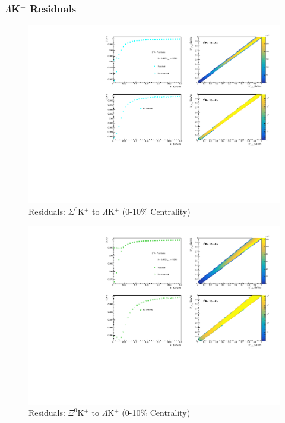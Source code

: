 \documentclass[../AnalysisNoteJBuxton.tex]{subfiles}
\begin{document}
\subsubsection{\texorpdfstring{$\Lambda$K$^{+}$}{TEXT} Residuals}
\label{Residuals_LamKchP}

\begin{figure}[h]
  \centering
  \includegraphics[width=\textwidth]{9_AdditionalFigures/Figures/Residuals/LamKchP/Residuals_LamKchP_0010_Sig0KchP_MomResCrctn_NonFlatBgdCrctn_10Res_PrimMaxDecay4fm_UsingXiDataAndCoulombOnly.pdf}
  \caption[Residuals: $\Sigma^{0}$K$^{+}$ to $\Lambda$K$^{+}$ (0-10\% Centrality)]{Residuals: $\Sigma^{0}$K$^{+}$ to $\Lambda$K$^{+}$ (0-10\% Centrality)}
  \label{fig:Res_LamKchP_0010_Sig0KchP}
\end{figure}


\begin{figure}[h]
  \centering
  \includegraphics[width=\textwidth]{9_AdditionalFigures/Figures/Residuals/LamKchP/Residuals_LamKchP_0010_Xi0KchP_MomResCrctn_NonFlatBgdCrctn_10Res_PrimMaxDecay4fm_UsingXiDataAndCoulombOnly.pdf}
  \caption[Residuals: $\Xi^{0}$K$^{+}$ to $\Lambda$K$^{+}$ (0-10\% Centrality)]{Residuals: $\Xi^{0}$K$^{+}$ to $\Lambda$K$^{+}$ (0-10\% Centrality)}
  \label{fig:Res_LamKchP_0010_Xi0KchP}
\end{figure}
\end{document}
